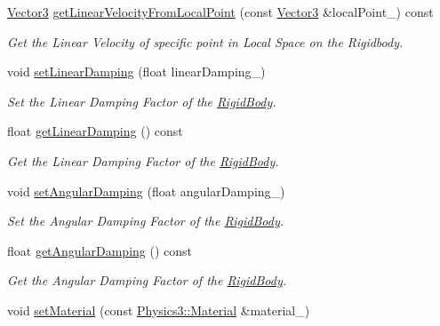\begin{DoxyCompactItemize}
\hyperlink{class_i_dream_sky_1_1_vector3}{Vector3} \hyperlink{class_i_dream_sky_1_1_physics3_1_1_vehicle_a2270af1a8c6b39da042dd091af3e7eb5}{get\+Linear\+Velocity\+From\+Local\+Point} (const \hyperlink{class_i_dream_sky_1_1_vector3}{Vector3} \&local\+Point\+\_\+) const 
\begin{DoxyCompactList}\small\item\em Get the Linear Velocity of specific point in Local Space on the Rigidbody. \end{DoxyCompactList}\item 
void \hyperlink{class_i_dream_sky_1_1_physics3_1_1_vehicle_a8d4928971c680f01a4a3f875781a5060}{set\+Linear\+Damping} (float linear\+Damping\+\_\+)
\begin{DoxyCompactList}\small\item\em Set the Linear Damping Factor of the \hyperlink{class_i_dream_sky_1_1_physics3_1_1_rigid_body}{Rigid\+Body}. \end{DoxyCompactList}\item 
float \hyperlink{class_i_dream_sky_1_1_physics3_1_1_vehicle_a2a78dc79a4f99e712e17345e177edfb0}{get\+Linear\+Damping} () const 
\begin{DoxyCompactList}\small\item\em Get the Linear Damping Factor of the \hyperlink{class_i_dream_sky_1_1_physics3_1_1_rigid_body}{Rigid\+Body}. \end{DoxyCompactList}\item 
void \hyperlink{class_i_dream_sky_1_1_physics3_1_1_vehicle_aa053b6a25d3a4a5402f05302e8847379}{set\+Angular\+Damping} (float angular\+Damping\+\_\+)
\begin{DoxyCompactList}\small\item\em Set the Angular Damping Factor of the \hyperlink{class_i_dream_sky_1_1_physics3_1_1_rigid_body}{Rigid\+Body}. \end{DoxyCompactList}\item 
float \hyperlink{class_i_dream_sky_1_1_physics3_1_1_vehicle_a2e183ab8bf3a19ca948036caf2905277}{get\+Angular\+Damping} () const 
\begin{DoxyCompactList}\small\item\em Get the Angular Damping Factor of the \hyperlink{class_i_dream_sky_1_1_physics3_1_1_rigid_body}{Rigid\+Body}. \end{DoxyCompactList}\item 
void \hyperlink{class_i_dream_sky_1_1_physics3_1_1_vehicle_a3f5d5ea6f43973026f4ab061354f0f7a}{set\+Material} (const \hyperlink{class_i_dream_sky_1_1_physics3_1_1_material}{Physics3\+::\+Material} \&material\+\_\+)

\end{DoxyCompactItemize}
